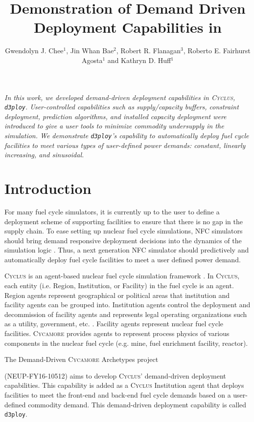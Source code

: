 \documentclass{anstrans}
\title{Demonstration of Demand Driven Deployment Capabilities in \Cyclus}
\author{Gwendolyn J. Chee$^1$, Jin Whan Bae$^2$, Robert R. Flanagan$^3$, Roberto E. Fairhurst Agosta$^1$ and Kathryn D. Huff$^1$}
\institute{
$^1$Dept. of Nuclear, Plasma and Radiological Engineering, University of Illinois at Urbana-Champaign \\
$^2$ Oak Ridge National Laboratory, Oak Ridge, TN, United States \\
$^3$Nuclear Engineering Program, University of South Carolina \\

gchee2@illinois.edu
}
\newcommand{\Cyclus}{\textsc{Cyclus}\xspace}%
\newcommand{\Cycamore}{\textsc{Cycamore}\xspace}%
\newcommand{\deploy}{\texttt{d3ploy}\xspace}%
\begin{document}
\section*{}
\textit{In this work, we developed demand-driven deployment 
capabilities in \Cyclus, \deploy. 
User-controlled capabilities such 
as supply/capacity buffers, constraint deployment, prediction 
algorithms, and installed capacity deployment were 
introduced to give a user tools to minimize commodity 
undersupply in the simulation. 
We demonstrate \deploy's capability 
to automatically deploy fuel cycle facilities to meet various 
types of user-defined power demands: constant, linearly increasing, 
and sinusoidal.}

\section{Introduction}
For many fuel cycle simulators, it is currently up to the user 
to define a deployment scheme of supporting facilities to ensure 
that there is no gap in the supply chain. 
To ease setting up nuclear fuel cycle simulations, \gls{NFC}
simulators should bring demand responsive deployment decisions into 
the dynamics of the simulation logic \cite{huff_current_2017}. 
Thus, a next generation \gls{NFC} simulator should predictively and 
automatically deploy fuel cycle facilities to meet a user defined 
power demand. 

\Cyclus is an agent-based nuclear fuel cycle simulation framework 
\cite{huff_fundamental_2016}. 
In \Cyclus, each entity (i.e. Region, Institution, or Facility) in the 
fuel cycle is an agent. 
Region agents represent geographical or political areas that institution
and facility agents can be grouped into. 
Institution agents control the 
deployment and decommission of facility agents 
and represents legal operating organizations such as a 
utility, government, etc. \cite{huff_fundamental_2016}. 
Facility agents represent nuclear fuel cycle facilities. 
\Cycamore \cite{carlsen_cycamore_2014}
provides agents to represent process physics of various 
components in the nuclear fuel cycle (e.g. mine, fuel enrichment 
facility, reactor). 

The Demand-Driven \Cycamore Archetypes project 

\noindent
(NEUP-FY16-10512) 
aims to develop \Cyclus' demand-driven deployment capabilities. 
This capability is added as a \Cyclus Institution
agent that deploys facilities to meet the front-end and back-end 
fuel cycle demands based on a user-defined commodity demand. 
This demand-driven deployment capability is called 
\deploy. 
\end{document}
